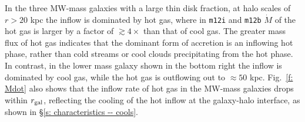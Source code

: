 \documentclass[class=article, crop=false]{standalone}
\newcommand{\Mdot}{\dot{M}}
\begin{document}
In the three MW-mass galaxies with a large thin disk fraction, at halo scales of $r>20$ kpc the inflow is dominated by hot gas, where in \texttt{m12i} and \texttt{m12b} $\Mdot$ of the hot gas is larger by a factor of $\gtrsim 4\times$ than that of cool gas.
The greater mass flux of hot gas indicates that the dominant form of accretion is an inflowing hot phase, rather than cold streams or cool clouds precipitating from the hot phase.
In contrast, in the lower mass galaxy shown in the bottom right the inflow is dominated by cool gas, while the hot gas is outflowing out to $\approx50$ kpc.
Fig.~\ref{f: Mdot} also shows that the inflow rate of hot gas in the MW-mass galaxies drops within $r_{\rm gal}$, reflecting the cooling of the hot inflow at the galaxy-halo interface, as shown in \S\ref{s: characteristics -- cools}.
\end{document}
